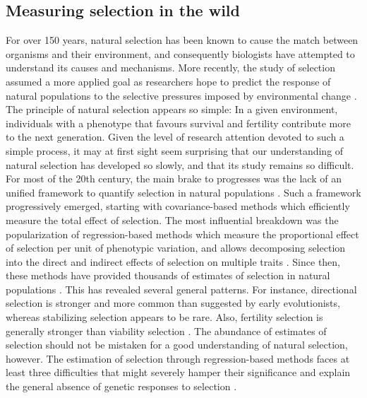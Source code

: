 \subsection{Measuring selection in the wild}
For over 150 years, natural selection has been known to cause the match between organisms and their environment, and consequently biologists have attempted to understand its causes and mechanisms. More recently, the study of selection assumed a more applied goal as researchers hope to predict the response of natural populations to the selective pressures imposed by environmental change \parencite{Chevin2010a, Coulson2010, Merila2014}.
The principle of natural selection appears so simple: In a given environment, individuals with a phenotype that favours survival and fertility contribute more to the next generation. Given the level of research attention devoted to such a simple process, it may at first sight seem surprising that our understanding of natural selection has developed so slowly, and that its study remains so difficult. 
For most of the 20th century, the main brake to progresses was the lack of an unified framework to quantify selection in natural populations \parencite{Wade2006}. Such a framework progressively emerged, starting with covariance-based methods \parencite{Robertson1966, Price1970} which efficiently measure the total effect of selection. The most influential breakdown was the popularization of regression-based methods \parencite{Lande1979,Lande1983} which measure the proportional effect of selection per unit of phenotypic variation, and allows decomposing selection into the direct and indirect effects of selection on multiple traits \parencite{Broodie1995}.
Since then, these methods have provided thousands of estimates of selection in natural populations \parencite{Kingsolver2001,Stinchcombe2008,Kingsolver2012}. This has revealed several general patterns. For instance, directional selection is stronger and more common than suggested by early evolutionists, whereas stabilizing selection appears to be rare. Also, fertility selection is generally stronger than viability selection \parencite{Kingsolver2012}.
The abundance of estimates of selection should not be mistaken for a good understanding of natural selection, however. The estimation of selection through regression-based methods faces at least three difficulties that might severely hamper their significance and explain the general absence of genetic responses to selection \parencite{Merila2001, Brookfield2016}.

